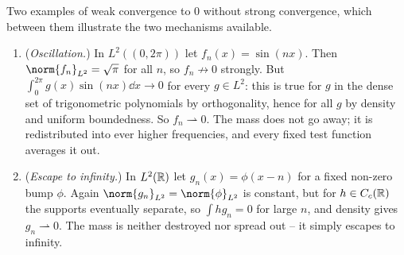 \documentclass[a4paper]{scrartcl}
\newcommand{\weakto}{\rightharpoonup}
\newcommand{\bumppath}{plot coordinates {
	(-1,0) (-0.95,0.0001) (-0.9,0.0141) (-0.85,0.0740) (-0.8,0.1691)
	(-0.75,0.2657) (-0.7,0.3825) (-0.65,0.4788) (-0.6,0.5698)
	(-0.55,0.6482) (-0.5,0.7165) (-0.45,0.7756) (-0.4,0.8266)
	(-0.35,0.8700) (-0.3,0.9057) (-0.25,0.9349) (-0.2,0.9594)
	(-0.15,0.9779) (-0.1,0.9900) (-0.05,0.9975) (0,1)
	(0.05,0.9975) (0.1,0.9900) (0.15,0.9779) (0.2,0.9594)
	(0.25,0.9349) (0.3,0.9057) (0.35,0.8700) (0.4,0.8266)
	(0.45,0.7756) (0.5,0.7165) (0.55,0.6482) (0.6,0.5698)
	(0.65,0.4788) (0.7,0.3825) (0.75,0.2657) (0.8,0.1691)
	(0.85,0.0740) (0.9,0.0141) (0.95,0.0001) (1,0)}}
\begin{document}
\begin{example}\label{ex:weaknotstrong}
	Two examples of weak convergence to $0$ without strong convergence, which between them illustrate the two mechanisms available.
	\begin{enumerate}[label=(\roman*)]
		\item (\emph{Oscillation.}) In $L^2((0,2\pi))$ let $f_n(x) = \sin(nx)$. Then $\norm{f_n}_{L^2} = \sqrt\pi$ for all $n$, so $f_n \not\to 0$ strongly. But $\int_0^{2\pi} g(x)\sin(nx) \dd x \to 0$ for every $g \in L^2$: this is true for $g$ in the dense set of trigonometric polynomials by orthogonality, hence for all $g$ by density and uniform boundedness. So $f_n \weakto 0$. The mass does not go away; it is redistributed into ever higher frequencies, and every fixed test function averages it out.
		\item (\emph{Escape to infinity.}) In $L^2(\mathbb{R})$ let $g_n(x) = \phi(x - n)$ for a fixed non-zero bump $\phi$. Again $\norm{g_n}_{L^2} = \norm{\phi}_{L^2}$ is constant, but for $h \in C_c(\mathbb{R})$ the supports eventually separate, so $\int h g_n = 0$ for large $n$, and density gives $g_n \weakto 0$. The mass is neither destroyed nor spread out -- it simply escapes to infinity.
	\end{enumerate}
\begin{center}
\end{center}
\end{example}
\end{document}
